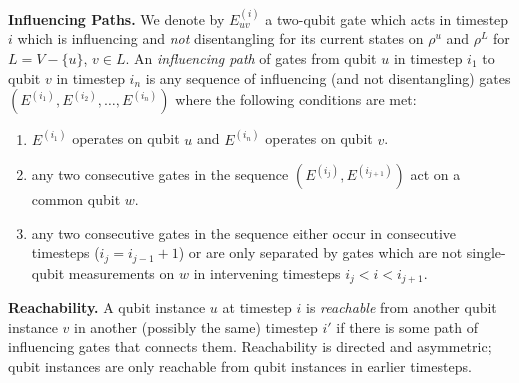 \begin{definition}{\textbf{Influencing Paths.}}
We denote by $E^{(i)}_{uv}$ a two-qubit gate which acts in
timestep $i$ which is influencing and \emph{not} disentangling for its current states
on $\rho^{u}$ and $\rho^{L}$ for $L = V - \{u\}$, $v \in L$.
An \emph{influencing path} of gates from qubit $u$ in timestep $i_1$ to
qubit $v$ in timestep $i_n$ is
any sequence of influencing (and not disentangling)
gates $(E^{(i_1)}, E^{(i_2)}, \ldots, E^{(i_n)})$
where the following conditions are met:

\begin{enumerate}
\item
$E^{(i_1)}$ operates on qubit $u$ and $E^{(i_n)}$ operates on qubit $v$.

\item
any two consecutive gates in the sequence $(E^{(i_j)},E^{(i_{j+1})})$
act on a common qubit $w$.
\item
any two consecutive gates in the sequence either occur in
consecutive timesteps ($i_j = i_{j-1} + 1$) or are only separated by
gates which are not single-qubit measurements on $w$ in intervening timesteps $i_j < i < i_{j+1}$.

\end{enumerate}

\end{definition}


\begin{definition}{\textbf{Reachability.}}
A qubit instance $u$ at timestep $i$ is \emph{reachable} from another qubit
instance $v$ in
another (possibly the same) timestep $i'$ if there is some path of influencing
gates that connects them. Reachability is directed and asymmetric; qubit
instances are only reachable from qubit instances in earlier timesteps.
\end{definition}


